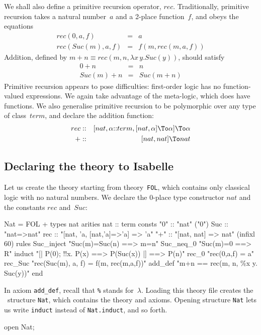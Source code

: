 \noindent
We shall also define a primitive recursion operator, $rec$.  Traditionally,
primitive recursion takes a natural number~$a$ and a 2-place function~$f$,
and obeys the equations
\begin{eqnarray*}
  rec(0,a,f)            & = & a \\
  rec(Suc(m),a,f)       & = & f(m, rec(m,a,f))
\end{eqnarray*}
Addition, defined by $m+n \equiv rec(m,n,\lambda x\,y.Suc(y))$,
should satisfy
\begin{eqnarray*}
  0+n      & = & n \\
  Suc(m)+n & = & Suc(m+n)
\end{eqnarray*}
Primitive recursion appears to pose difficulties: first-order logic has no
function-valued expressions.  We again take advantage of the meta-logic,
which does have functions.  We also generalise primitive recursion to be
polymorphic over any type of class~$term$, and declare the addition
function:
\begin{eqnarray*}
  rec   & :: & [nat, \alpha{::}term, [nat,\alpha]\To\alpha] \To\alpha \\
  +     & :: & [nat,nat]\To nat 
\end{eqnarray*}


\subsection{Declaring the theory to Isabelle}
Let us create the theory  starting from theory~\verb$FOL$,
which contains only classical logic with no natural numbers.  We declare
the 0-place type constructor $nat$ and the constants $rec$ and~$Suc$:
\begin{ttbox}
Nat = FOL +
types   nat
arities nat         :: term
consts  "0"         :: "nat"                              ("0")
        Suc         :: "nat=>nat"
        rec         :: "[nat, 'a, [nat,'a]=>'a] => 'a"
        "+"         :: "[nat, nat] => nat"                (infixl 60)
rules   Suc_inject  "Suc(m)=Suc(n) ==> m=n"
        Suc_neq_0   "Suc(m)=0      ==> R"
        induct      "[| P(0);  !!x. P(x) ==> P(Suc(x)) |]  ==> P(n)"
        rec_0       "rec(0,a,f) = a"
        rec_Suc     "rec(Suc(m), a, f) = f(m, rec(m,a,f))"
        add_def     "m+n == rec(m, n, \%x y. Suc(y))"
end
\end{ttbox}
In axiom {\tt add_def}, recall that \verb|%| stands for~$\lambda$.
Loading this theory file creates the \ML\ structure {\tt Nat}, which
contains the theory and axioms.  Opening structure {\tt Nat} lets us write
{\tt induct} instead of {\tt Nat.induct}, and so forth.
\begin{ttbox}
open Nat;
\end{ttbox}

